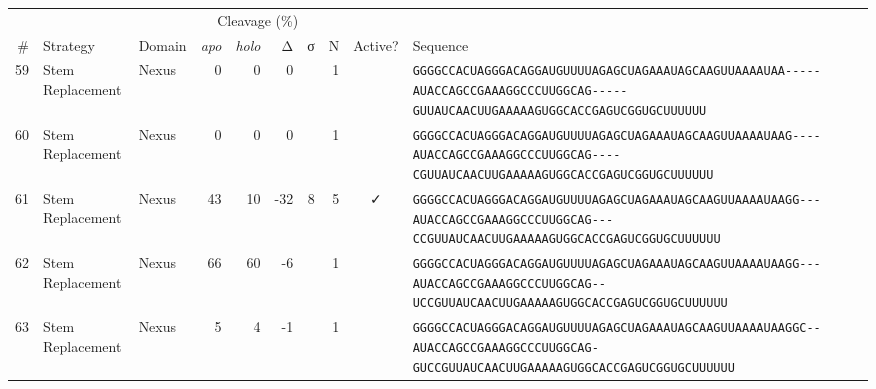 \begin{tabular}{rllrrrrrcl}
\toprule

&
&
&
\multicolumn{4}{c}{Cleavage (\%)} &
&
&
\\
\cmidrule(r){4-7}

\# &
Strategy &
Domain &
\multicolumn{1}{r}{\textit{apo}} &
\multicolumn{1}{r}{\textit{holo}} &
\multicolumn{1}{r}{Δ} &
\multicolumn{1}{r}{σ} &
N &
Active? &
Sequence \\
\midrule

 59 & Stem Replacement & Nexus & 0 & 0 & 0 &  & 1 &  &
 \color{ucsfdarkgrey}\verb|GGGGCCACUAGGGACAGGAU|\color{ucsforange}\verb|GUUUUA|\color{ucsfblue}\verb|GAGCUAGAAAUAGCAAGU|\color{ucsforange}\verb|UAAAAUAA|\color{ucsfnavy}\verb|-----|\color{ucsfpurple}\verb|AUACCAGCCGAAAGGCCCUUGGCAG|\color{ucsfnavy}\verb|-----GU|\color{ucsforange}\verb|UAUCA|\color{ucsfteal}\verb|ACUUGAAAAAGUG|\color{ucsforange}\verb|GCACCGAGUCGGUGCUUUUUU| \\

 60 & Stem Replacement & Nexus & 0 & 0 & 0 &  & 1 &  &
 \color{ucsfdarkgrey}\verb|GGGGCCACUAGGGACAGGAU|\color{ucsforange}\verb|GUUUUA|\color{ucsfblue}\verb|GAGCUAGAAAUAGCAAGU|\color{ucsforange}\verb|UAAAAUAA|\color{ucsfnavy}\verb|G----|\color{ucsfpurple}\verb|AUACCAGCCGAAAGGCCCUUGGCAG|\color{ucsfnavy}\verb|----CGU|\color{ucsforange}\verb|UAUCA|\color{ucsfteal}\verb|ACUUGAAAAAGUG|\color{ucsforange}\verb|GCACCGAGUCGGUGCUUUUUU| \\

 61 & Stem Replacement & Nexus & 43 & 10 & -32 & 8 & 5 & ✓ &
 \color{ucsfdarkgrey}\verb|GGGGCCACUAGGGACAGGAU|\color{ucsforange}\verb|GUUUUA|\color{ucsfblue}\verb|GAGCUAGAAAUAGCAAGU|\color{ucsforange}\verb|UAAAAUAA|\color{ucsfnavy}\verb|GG---|\color{ucsfpurple}\verb|AUACCAGCCGAAAGGCCCUUGGCAG|\color{ucsfnavy}\verb|---CCGU|\color{ucsforange}\verb|UAUCA|\color{ucsfteal}\verb|ACUUGAAAAAGUG|\color{ucsforange}\verb|GCACCGAGUCGGUGCUUUUUU| \\

 62 & Stem Replacement & Nexus & 66 & 60 & -6 &  & 1 &  &
 \color{ucsfdarkgrey}\verb|GGGGCCACUAGGGACAGGAU|\color{ucsforange}\verb|GUUUUA|\color{ucsfblue}\verb|GAGCUAGAAAUAGCAAGU|\color{ucsforange}\verb|UAAAAUAA|\color{ucsfnavy}\verb|GG---|\color{ucsfpurple}\verb|AUACCAGCCGAAAGGCCCUUGGCAG|\color{ucsfnavy}\verb|--UCCGU|\color{ucsforange}\verb|UAUCA|\color{ucsfteal}\verb|ACUUGAAAAAGUG|\color{ucsforange}\verb|GCACCGAGUCGGUGCUUUUUU| \\

 63 & Stem Replacement & Nexus & 5 & 4 & -1 &  & 1 &  &
 \color{ucsfdarkgrey}\verb|GGGGCCACUAGGGACAGGAU|\color{ucsforange}\verb|GUUUUA|\color{ucsfblue}\verb|GAGCUAGAAAUAGCAAGU|\color{ucsforange}\verb|UAAAAUAA|\color{ucsfnavy}\verb|GGC--|\color{ucsfpurple}\verb|AUACCAGCCGAAAGGCCCUUGGCAG|\color{ucsfnavy}\verb|-GUCCGU|\color{ucsforange}\verb|UAUCA|\color{ucsfteal}\verb|ACUUGAAAAAGUG|\color{ucsforange}\verb|GCACCGAGUCGGUGCUUUUUU| \\


\end{tabular}
